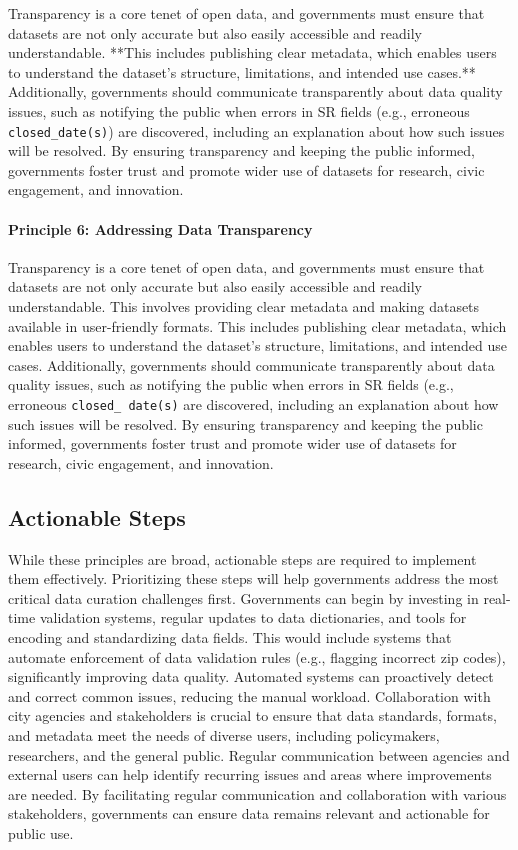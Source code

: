 \documentclass[linenumber]{jdsart}
\begin{document}
Transparency is a core tenet of open data, and governments must ensure that datasets are not only accurate but also easily accessible and readily understandable. **This includes publishing clear metadata, which enables users to understand the dataset’s structure, limitations, and intended use cases.** Additionally, governments should communicate transparently about data quality issues, such as notifying the public when errors in SR fields (e.g., erroneous \texttt{closed\_date(s)}) are discovered, including an explanation about how such issues will be resolved. By ensuring transparency and keeping the public informed, governments foster trust and promote wider use of datasets for research, civic engagement, and innovation.

\paragraph{Principle 6: Addressing Data Transparency}
Transparency is a core tenet of open data, and governments must ensure 
that datasets are not only accurate but also easily accessible and 
readily understandable. This involves providing clear 
metadata and making datasets available in user-friendly 
formats. This includes publishing clear metadata, which enables users
to understand the dataset’s structure, limitations, and intended use
cases. Additionally, governments should communicate transparently
about data quality issues, such as notifying the public when errors in SR 
fields (e.g., erroneous \texttt{closed\_ date(s)} are discovered, including
an explanation about how such issues will be resolved. By 
ensuring transparency and keeping the public informed, 
governments foster trust and promote wider use of datasets 
for research, civic engagement, and innovation.


\subsection{Actionable Steps}
While these principles are broad, actionable steps are required to 
implement them effectively. Prioritizing these steps will help
governments address the most critical data curation challenges
first. Governments can begin by investing in
real-time validation systems, regular updates to data dictionaries, 
and tools for encoding and standardizing data fields. This would include
systems that automate enforcement of data validation rules 
(e.g., flagging incorrect zip codes), significantly improving data 
quality. Automated systems can proactively detect and correct common
issues, reducing the manual workload.
Collaboration with city agencies and stakeholders is crucial
to ensure that data standards, formats, and metadata meet the needs 
of diverse users, including policymakers, researchers, and the 
general public. Regular communication between agencies and external 
users can help identify recurring issues and areas where improvements 
are needed. By facilitating regular communication and collaboration 
with various stakeholders, governments can ensure data remains relevant 
and actionable for public use.
\end{document}
